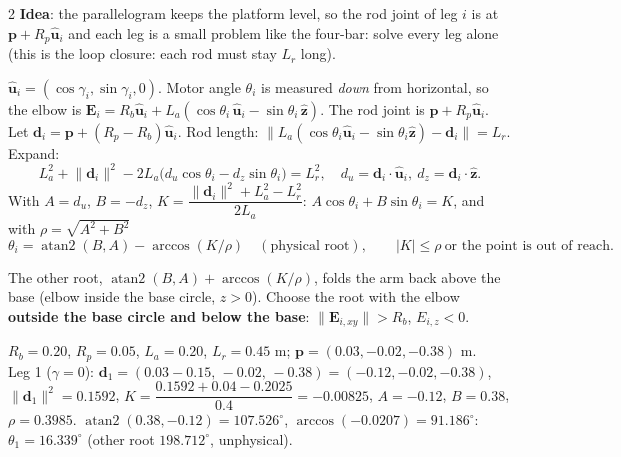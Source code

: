 \begin{multicols}{2}
\textbf{Idea}: the parallelogram keeps the platform level, so the rod joint of leg $i$ is at $\mathbf p+R_p\hat{\mathbf u}_i$ and each leg is a small problem like the four-bar: solve every leg alone (this is the loop closure: each rod must stay $L_r$ long).
\begin{deriv}[leg $i$, azimuth $\gamma_i=0^\circ,120^\circ,240^\circ$]
$\hat{\mathbf u}_i=(\cos\gamma_i,\sin\gamma_i,0)$. Motor angle $\theta_i$ is measured \emph{down} from horizontal, so the elbow is $\mathbf E_i=R_b\hat{\mathbf u}_i+L_a(\cos\theta_i\,\hat{\mathbf u}_i-\sin\theta_i\,\hat{\mathbf z})$. The rod joint is $\mathbf p+R_p\hat{\mathbf u}_i$. Let $\mathbf d_i=\mathbf p+(R_p-R_b)\hat{\mathbf u}_i$. Rod length: $\lVert L_a(\cos\theta_i\hat{\mathbf u}_i-\sin\theta_i\hat{\mathbf z})-\mathbf d_i\rVert=L_r$. Expand:
\[L_a^2+\lVert\mathbf d_i\rVert^2-2L_a\big(d_u\cos\theta_i-d_z\sin\theta_i\big)=L_r^2,\quad d_u=\mathbf d_i\!\cdot\!\hat{\mathbf u}_i,\ d_z=\mathbf d_i\!\cdot\!\hat{\mathbf z}.\]
With $A=d_u$, $B=-d_z$, $K=\dfrac{\lVert\mathbf d_i\rVert^2+L_a^2-L_r^2}{2L_a}$: $A\cos\theta_i+B\sin\theta_i=K$, and with $\rho=\sqrt{A^2+B^2}$
\[\theta_i=\operatorname{atan2}(B,A)-\arccos(K/\rho)\quad(\text{physical root}),\qquad\lvert K\rvert\le\rho\ \text{or the point is out of reach.}\]
\end{deriv}
\begin{fbx}
The other root, $\operatorname{atan2}(B,A)+\arccos(K/\rho)$, folds the arm back above the base (elbow inside the base circle, $z>0$). Choose the root with the elbow \textbf{outside the base circle and below the base}: $\lVert\mathbf E_{i,xy}\rVert>R_b$, $E_{i,z}<0$. 
\end{fbx}
\begin{worked}
$R_b=0.20$, $R_p=0.05$, $L_a=0.20$, $L_r=0.45$ m; $\mathbf p=(0.03,-0.02,-0.38)$ m.\\
Leg 1 ($\gamma=0$): $\mathbf d_1=(0.03-0.15,\,-0.02,\,-0.38)=(-0.12,-0.02,-0.38)$, $\lVert\mathbf d_1\rVert^2=0.1592$, $K=\dfrac{0.1592+0.04-0.2025}{0.4}=-0.00825$, $A=-0.12$, $B=0.38$, $\rho=0.3985$. $\operatorname{atan2}(0.38,-0.12)=107.526^\circ$, $\arccos(-0.0207)=91.186^\circ$: $\theta_1=16.339^\circ$ (other root $198.712^\circ$, unphysical).\\

\end{worked}
\end{multicols}
